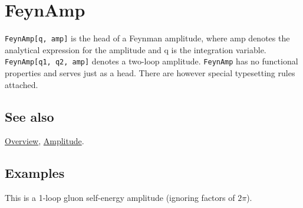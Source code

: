\documentclass[../FeynCalcManual.tex]{subfiles}
\begin{document}
\hypertarget{feynamp}{%
\section{FeynAmp}\label{feynamp}}

\texttt{FeynAmp[\allowbreak{}q,\ \allowbreak{}amp]} is the head of a
Feynman amplitude, where amp denotes the analytical expression for the
amplitude and q is the integration variable.
\texttt{FeynAmp[\allowbreak{}q1,\ \allowbreak{}q2,\ \allowbreak{}amp]}
denotes a two-loop amplitude. \texttt{FeynAmp} has no functional
properties and serves just as a head. There are however special
typesetting rules attached.

\subsection{See also}

\hyperlink{toc}{Overview}, \hyperlink{amplitude}{Amplitude}.

\subsection{Examples}

This is a 1-loop gluon self-energy amplitude (ignoring factors of
\(2 \pi\)).

\begin{Shaded}
\begin{Highlighting}[]
\OperatorTok{[}\OperatorTok{,}\OperatorTok{[}\OperatorTok{,} \SpecialCharTok{\textbackslash{}}\OperatorTok{[}\OperatorTok{],} \OperatorTok{,}  \SpecialCharTok{{-}} \OperatorTok{,} \SpecialCharTok{\textbackslash{}}\OperatorTok{[}\OperatorTok{],} \OperatorTok{,} \SpecialCharTok{{-}}\OperatorTok{,} \SpecialCharTok{\textbackslash{}}\OperatorTok{[}\OperatorTok{],} \OperatorTok{]}\OperatorTok{[} \SpecialCharTok{{-}} \OperatorTok{,} \SpecialCharTok{\textbackslash{}}\OperatorTok{[}\OperatorTok{],} \OperatorTok{,} \SpecialCharTok{\textbackslash{}}\OperatorTok{[}\OperatorTok{],} \OperatorTok{]}\OperatorTok{[}\SpecialCharTok{{-}}\OperatorTok{,} \SpecialCharTok{\textbackslash{}}\OperatorTok{[}\OperatorTok{],} \OperatorTok{,}  \SpecialCharTok{{-}} \OperatorTok{,} \SpecialCharTok{\textbackslash{}}\OperatorTok{[}\OperatorTok{],} \OperatorTok{,} \OperatorTok{,} \SpecialCharTok{\textbackslash{}}\OperatorTok{[}\OperatorTok{],} \OperatorTok{]} \SpecialCharTok{*}
\OperatorTok{[}\OperatorTok{,} \SpecialCharTok{\textbackslash{}}\OperatorTok{[}\OperatorTok{],} \OperatorTok{,} \SpecialCharTok{\textbackslash{}}\OperatorTok{[}\OperatorTok{],} \OperatorTok{]]}
\end{Highlighting}
\end{Shaded}
\end{document}
